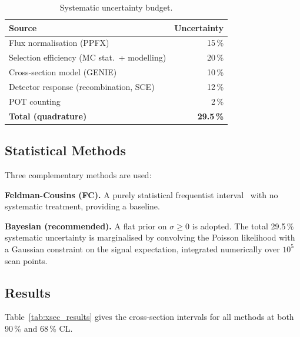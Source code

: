 \documentclass[12pt,a4paper]{article}
\begin{document}
\begin{table}[H]
  \centering
  \caption{Systematic uncertainty budget.}
  \label{tab:syst}
  \begin{tabular}{lr}
    \toprule
    Source & Uncertainty \\
    \midrule
    Flux normalisation (PPFX)    & 15\,\% \\
    Selection efficiency (MC stat.\ + modelling) & 20\,\% \\
    Cross-section model (GENIE)  & 10\,\% \\
    Detector response (recombination, SCE) & 12\,\% \\
    POT counting                 &  2\,\% \\
    \midrule
    \textbf{Total (quadrature)}  & \textbf{29.5\,\%} \\
    \bottomrule
  \end{tabular}
\end{table}

\subsection{Statistical Methods}

Three complementary methods are used:

\textbf{Feldman-Cousins (FC).}
A purely statistical frequentist interval~\cite{Feldman:1997qc}
with no systematic treatment, providing a baseline.

\textbf{Bayesian (recommended).}
A flat prior on $\sigma \geq 0$ is adopted.  The total 29.5\,\%
systematic uncertainty is marginalised by convolving the Poisson
likelihood with a Gaussian constraint on the signal expectation,
integrated numerically over $10^5$ scan points.

\subsection{Results}

Table~\ref{tab:xsec_results} gives the cross-section intervals for all
methods at both 90\,\% and 68\,\% CL.
\end{document}
